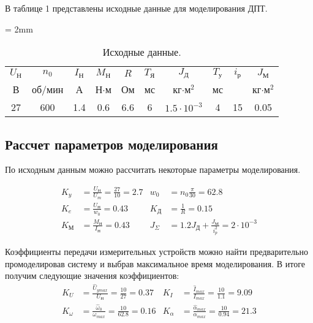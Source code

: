 \documentclass[a4paper, 12pt]{article}
\begin{document}
В таблице 1 представлены исходные данные для моделирования ДПТ.
\begin{table}[h!]
	\tabulinesep = 2mm
	\centering
	\begin{threeparttable}
 		\caption{ Исходные данные.}\label{tab:perflogcross}
   \begin{tabular}{|c|c|c|c|c|c|c|c|c|c|}
            \hline
            $U_\text{Н}$ & $n_0$ & $I_\text{Н}$ & $M_\text{Н}$ & $R$ & $T_\text{Я}$ & $J_\text{Д}$ & $T_\text{у}$ & $i_\text{р}$ & $J_\text{М}$\\
            В & об/мин & А & Н$\cdot$м & Ом & мс & кг$\cdot\text{м}^2$ & мс & &  кг$\cdot\text{м}^2$ \\ \hline
            27 & 600 & 1.4 & 0.6 & 6.6 & 6 & $1.5\cdot10^{-3}$ & 4 & 15 & 0.05 \\
            \hline
        \end{tabular}

    \end{threeparttable}    
\end{table}
\newpage
\begin{center}
\section{Рассчет параметров моделирования}
\end{center}
\par По исходным данным можно рассчитать некоторые параметры моделирования.\par
\begin{align*}
    K_y & = \frac{U_\text{Н}}{U_m} = \frac{27}{10} = 2.7 & w_0 & = n_0\frac{\pi}{30} = 62.8 \\
    K_e & = \frac{U_\text{Н}}{w_0} = 0.43 & K_\text{Д} & = \frac{1}{R} = 0.15 \\
    K_\text{М} & = \frac{M_\text{Н}}{I_\text{Н}} =  0.43 & J_{\Sigma} & = 1.2J_\text{Д} + \frac{J_\text{М}}{i^2_p} = 2 \cdot 10^{-3}
\end{align*} \par
Коэффициенты передачи измерительных устройств можно найти предварительно промоделировав систему и выбрав максимальное время моделирования. В итоге получим следующие значения коэффициентов: 
\begin{align*}
    K_U & = \frac{\hat{U}_{ymax}}{U_\text{Н}} = \frac{10}{27} = 0.37  & K_I & = \frac{\hat{I}_{max}}{I_{max}} = \frac{10}{1.1} =  9.09\\
    K_\omega & = \frac{\hat{\omega}_{0}}{\omega_{max}} = \frac{10}{62.8} = 0.16 & K_\alpha & = \frac{\hat{\alpha}_{max}}{\alpha_{max}} = \frac{10}{0.94} = 21.3
\end{align*}
\end{document}
